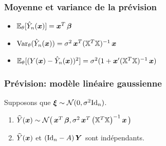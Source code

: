 \begin{frame}
\frametitle{Moyenne et variance de la prévision}
\begin{theorem}
\begin{itemize}
\item \alert<1>{$\PE_{\truetheta}[\hat{Y}_n(\bx)]= \bx^T \truebeta$}
\item \alert<2>{$\Var_{\truetheta}(\hat{Y}_n(\bx))= \sigma^2 \bx^T (\regressmat^T \regressmat)^{-1} \bx$}
\item \alert<3>{$\PE_{\truetheta}[ (Y(\bx) - \hat{Y}_n(\bx))^2]= \sigma^2 (1 + \bx' (\regressmat^T \regressmat)^{-1} \bx)$}
\end{itemize}
\end{theorem}
\end{frame}


\begin{frame}
\frametitle{Prévision: modèle linéaire gaussienne}
\begin{prop}
Supposons que $\bnoise \sim {\mathcal N}(0,\sigma^2\mathrm{Id}_n)$.
\begin{enumerate}
\item $\widehat{Y}(\bx) \sim {\mathcal N}\big(\bx ^T\truebeta, \sigma^2 \bx^T \big(\regressmat^T\regressmat\big)^{-1} \bx \big)$
\item $\widehat{Y}(\bx)$ et $(\Id{n} - \projX) \bY$ sont
indépendants.
\end{enumerate}
\end{prop}
\end{frame}

